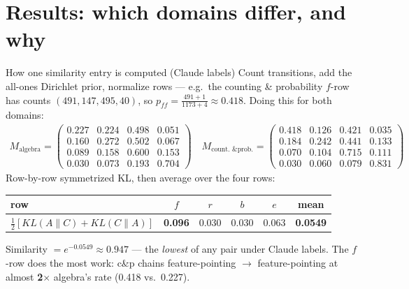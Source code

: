 \documentclass[10pt,aspectratio=169]{beamer}
\begin{document}
\section{Results: which domains differ, and why}

\begin{frame}{How one similarity entry is computed (Claude labels)}
  \footnotesize
  Count transitions, add the all-ones Dirichlet prior, normalize rows --- e.g.\ the
  counting \& probability $f$-row has counts $(491,147,495,40)$, so
  $p_{ff}=\frac{491+1}{1173+4}\approx 0.418$. Doing this for both domains:
  \begin{align*}
    M_{\text{algebra}}=\begin{pmatrix}
      0.227 & 0.224 & 0.498 & 0.051\\
      0.160 & 0.272 & 0.502 & 0.067\\
      0.089 & 0.158 & 0.600 & 0.153\\
      0.030 & 0.073 & 0.193 & 0.704
    \end{pmatrix}
    \quad
    M_{\text{count.\ \& prob.}}=\begin{pmatrix}
      \mathbf{0.418} & 0.126 & 0.421 & 0.035\\
      0.184 & 0.242 & 0.441 & 0.133\\
      0.070 & 0.104 & 0.715 & 0.111\\
      0.030 & 0.060 & 0.079 & \mathbf{0.831}
    \end{pmatrix}
  \end{align*}
  Row-by-row symmetrized KL, then average over the four rows:
  \begin{center}
    \begin{tabular}{lcccc|c}
      \toprule
      row & $f$ & $r$ & $b$ & $e$ & mean \\
      \midrule
      $\tfrac12\!\left[KL(A\|C)+KL(C\|A)\right]$ & \textbf{0.096} & 0.030 & 0.030 & 0.063 & \textbf{0.0549} \\
      \bottomrule
    \end{tabular}
  \end{center}
  \smallskip
  Similarity $=e^{-0.0549}\approx 0.947$ --- the \emph{lowest} of any pair under Claude labels.
  The $f$-row does the most work: c\&p chains feature-pointing $\to$ feature-pointing
  at almost \textbf{2$\times$} algebra's rate (0.418 vs.\ 0.227).
\end{frame}
\end{document}
